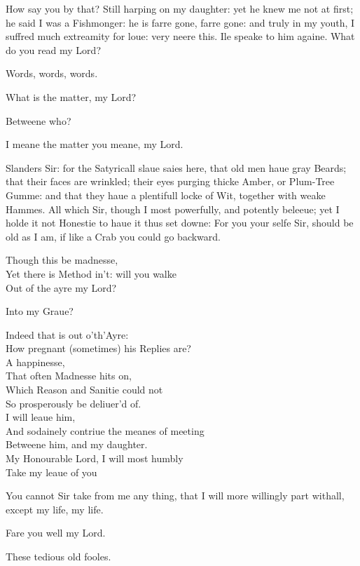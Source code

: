 \documentclass[a5paper,DIV=calc,11pt]{scrbook}
\begin{document}
\begin{drama*}
    \polspeaks How say you by that? Still harping on my daughter: yet he knew me not at first; he said I was a Fishmonger: he is farre gone, farre gone: and truly in my youth, I suffred much extreamity for loue: very neere this. Ile speake to him againe. What do you read my Lord?
    
    \hamspeaks Words, words, words.
    
    \polspeaks What is the matter, my Lord?
    
    \hamspeaks Betweene who?
    
    \polspeaks I meane the matter you meane, my Lord.
    
    \hamspeaks Slanders Sir: for the Satyricall slaue saies here, that old men haue gray Beards; that their faces are wrinkled; their eyes purging thicke Amber, or Plum-Tree Gumme: and that they haue a plentifull locke of Wit, together with weake Hammes. All which Sir, though I most powerfully, and potently beleeue; yet I holde it not Honestie to haue it thus set downe: For you your selfe Sir, should be old as I am, if like a Crab you could go backward.
    
    \polspeaks Though this be madnesse,\\
    Yet there is Method in't: will you walke\\
    Out of the ayre my Lord?
    
    \hamspeaks Into my Graue?
    
    \polspeaks Indeed that is out o'th'Ayre:\\
    How pregnant (sometimes) his Replies are?\\
    A happinesse,\\
    That often Madnesse hits on,\\
    Which Reason and Sanitie could not\\
    So prosperously be deliuer'd of.\\
    I will leaue him,\\
    And sodainely contriue the meanes of meeting\\
    Betweene him, and my daughter.\\
    My Honourable Lord, I will most humbly\\
    Take my leaue of you
    
    \hamspeaks You cannot Sir take from me any thing, that I will more willingly part withall, except my life, my life.
    
    \polspeaks Fare you well my Lord.
    
    \hamspeaks These tedious old fooles.
    

\end{drama*}
\end{document}
